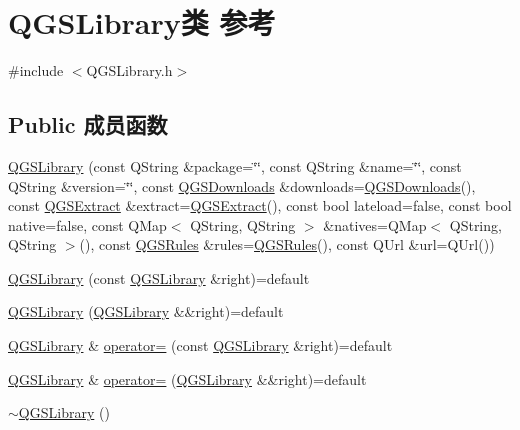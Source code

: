 \hypertarget{class_q_g_s_library}{}\section{Q\+G\+S\+Library类 参考}
\label{class_q_g_s_library}


{\ttfamily \#include $<$Q\+G\+S\+Library.\+h$>$}

\subsection*{Public 成员函数}
\begin{DoxyCompactItemize}
\item 
\mbox{\hyperlink{class_q_g_s_library_a75d51341074e016b5be184a26546479d}{Q\+G\+S\+Library}} (const Q\+String \&package=\char`\"{}\char`\"{}, const Q\+String \&name=\char`\"{}\char`\"{}, const Q\+String \&version=\char`\"{}\char`\"{}, const \mbox{\hyperlink{class_q_g_s_downloads}{Q\+G\+S\+Downloads}} \&downloads=\mbox{\hyperlink{class_q_g_s_downloads}{Q\+G\+S\+Downloads}}(), const \mbox{\hyperlink{class_q_g_s_extract}{Q\+G\+S\+Extract}} \&extract=\mbox{\hyperlink{class_q_g_s_extract}{Q\+G\+S\+Extract}}(), const bool lateload=false, const bool native=false, const Q\+Map$<$ Q\+String, Q\+String $>$ \&natives=Q\+Map$<$ Q\+String, Q\+String $>$(), const \mbox{\hyperlink{class_q_g_s_rules}{Q\+G\+S\+Rules}} \&rules=\mbox{\hyperlink{class_q_g_s_rules}{Q\+G\+S\+Rules}}(), const Q\+Url \&url=Q\+Url())
\item 
\mbox{\hyperlink{class_q_g_s_library_a4b04c67dd8b2974e1bef8ea9a15c021c}{Q\+G\+S\+Library}} (const \mbox{\hyperlink{class_q_g_s_library}{Q\+G\+S\+Library}} \&right)=default
\item 
\mbox{\hyperlink{class_q_g_s_library_a50047cb58ea000a43f05b1a26d97d4c7}{Q\+G\+S\+Library}} (\mbox{\hyperlink{class_q_g_s_library}{Q\+G\+S\+Library}} \&\&right)=default
\item 
\mbox{\hyperlink{class_q_g_s_library}{Q\+G\+S\+Library}} \& \mbox{\hyperlink{class_q_g_s_library_a038caacf56691ec718969d7bc334b47b}{operator=}} (const \mbox{\hyperlink{class_q_g_s_library}{Q\+G\+S\+Library}} \&right)=default
\item 
\mbox{\hyperlink{class_q_g_s_library}{Q\+G\+S\+Library}} \& \mbox{\hyperlink{class_q_g_s_library_a499828daf071ff7d47380bae8feb298c}{operator=}} (\mbox{\hyperlink{class_q_g_s_library}{Q\+G\+S\+Library}} \&\&right)=default
\item 
\mbox{\hyperlink{class_q_g_s_library_affdeefe32392e5f0c9116578ad7f6f39}{$\sim$\+Q\+G\+S\+Library}} ()

\end{DoxyCompactItemize}
